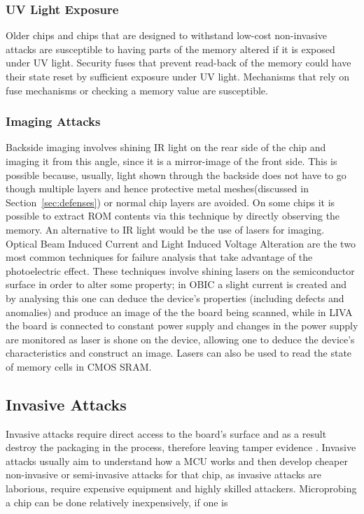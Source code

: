 	\subsubsection{UV Light Exposure}
	Older chips and chips that are designed to withstand low-cost non-invasive attacks are susceptible to having parts of the memory altered if it is exposed under UV light. Security fuses that prevent read-back of the memory could have their state reset by sufficient exposure under UV light. Mechanisms that rely on fuse mechanisms or checking a memory value are susceptible.

	\subsubsection{Imaging Attacks}
	Backside imaging involves shining IR light on the rear side of the chip and imaging it from this angle, since it is a mirror-image of the front side. This is possible because, usually, light shown through the backside does not have to go though multiple layers and hence protective metal meshes(discussed in Section~\ref{sec:defenses}) or normal chip layers are avoided. On some chips it is possible to extract ROM contents via this technique by directly observing the memory. An alternative to IR light would be the use of lasers for imaging. Optical Beam Induced Current and Light Induced Voltage Alteration are the two most common techniques for failure analysis that take advantage of the photoelectric effect. These techniques involve shining lasers on the semiconductor surface in order to alter some property; in OBIC a slight current is created and by analysing this one can deduce the device's properties (including defects and anomalies) and produce an image of the the board being scanned, while in LIVA the board is connected to constant power supply and changes in the power supply are monitored as laser is shone on the device, allowing one to deduce the device's characteristics and construct an image\citep{cole:OBIC}. Lasers can also be used to read the state of memory cells in CMOS SRAM\citep{sergei:thesis}.
	
	\subsection{Invasive Attacks}
	Invasive attacks require direct access to the board's surface and as a result destroy the packaging in the process, therefore leaving tamper evidence\citep{sergei:thesis} \citep{hwre}. Invasive attacks usually aim to understand how a MCU works and then develop cheaper non-invasive or semi-invasive attacks for that chip, as invasive attacks are laborious, require expensive equipment and highly skilled attackers\citep{sergei:thesis}. Microprobing a chip can be done relatively inexpensively, if one is 
	
